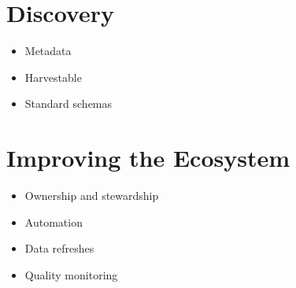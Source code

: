 \documentclass[
]{book}
\providecommand{\tightlist}{%
  \setlength{\itemsep}{0pt}\setlength{\parskip}{0pt}}
\begin{document}
\hypertarget{discovery}{%
\section{Discovery}\label{discovery}}

\begin{itemize}
\tightlist
\item
  Metadata
\item
  Harvestable
\item
  Standard schemas
\end{itemize}

\hypertarget{improving-the-ecosystem}{%
\section{Improving the Ecosystem}\label{improving-the-ecosystem}}

\begin{itemize}
\tightlist
\item
  Ownership and stewardship
\item
  Automation
\item
  Data refreshes
\item
  Quality monitoring
\end{itemize}

  
\end{document}
